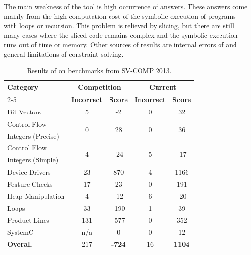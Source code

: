 The main weakness of the tool is high occurrence of  answers.
These answers come mainly from the high computation cost of the symbolic
execution of programs with loops or recursion. This problem is relieved by
slicing, but there are still many cases where the sliced code remains complex
and the symbolic execution runs out of time or memory. Other sources of
 results are internal errors of \klee and general limitations of
constraint solving.

\begin{table}[tb]
\begin{center}
\begin{tabular}{|l||c|c||c|c|} \hline
\multirow{2}{*}{\textbf{Category}} &
  \multicolumn{2}{c||}{\textbf{Competition}} &
  \multicolumn{2}{c|}{\textbf{Current}} \\ \cline{2-5}
& \textbf{Incorrect} & \textbf{Score} &
  \textbf{Incorrect} & \textbf{Score} \\ \hline\hline
Bit Vectors           &   5 &   -2 &  0 & 32 \\ \hline
Control Flow          &
  \multirow{2}{*}{0} & \multirow{2}{*}{28} & \multirow{2}{*}{0} &
  \multirow{2}{*}{36} \\
Integers (Precise)    &     &      &    &    \\ \hline

Control Flow          &
  \multirow{2}{*}{4} & \multirow{2}{*}{-24} & \multirow{2}{*}{5} &
  \multirow{2}{*}{-17} \\
Integers (Simple)     &     &      &    &    \\ \hline

Device Drivers        &  23 &  870 &  4 & 1166 \\ \hline
Feature Checks        &  17 &   23 &  0 &  191 \\ \hline
Heap Manipulation     &   4 &  -12 &  6 &  -20 \\ \hline
Loops                 &  33 & -190 &  1 &   39 \\ \hline
Product Lines         & 131 & -577 &  0 &  352 \\ \hline
SystemC               & n/a &    0 &  0 &   12 \\ \hline\hline
\textbf{Overall}      & 217 & \textbf{-724} & 16 & \textbf{1104} \\ \hline
\end{tabular}
\end{center}
  \caption{Results of \symbio on benchmarks from SV-COMP 2013.}
  \label{tab:svcomp_results}
\end{table}

